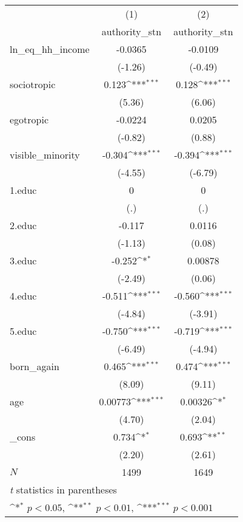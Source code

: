 \documentclass[11pt]{article}
\begin{document}
{
\def\sym#1{\ifmmode^{#1}\else\(^{#1}\)\fi}
\begin{tabular}{l*{2}{c}}
\hline\hline
            &\multicolumn{1}{c}{(1)}&\multicolumn{1}{c}{(2)}\\
            &\multicolumn{1}{c}{authority\_stn}&\multicolumn{1}{c}{authority\_stn}\\
\hline
ln\_eq\_hh\_income&     -0.0365         &     -0.0109         \\
            &     (-1.26)         &     (-0.49)         \\
[1em]
sociotropic &       0.123\sym{***}&       0.128\sym{***}\\
            &      (5.36)         &      (6.06)         \\
[1em]
egotropic   &     -0.0224         &      0.0205         \\
            &     (-0.82)         &      (0.88)         \\
[1em]
visible\_minority&      -0.304\sym{***}&      -0.394\sym{***}\\
            &     (-4.55)         &     (-6.79)         \\
[1em]
1.educ      &           0         &           0         \\
            &         (.)         &         (.)         \\
[1em]
2.educ      &      -0.117         &      0.0116         \\
            &     (-1.13)         &      (0.08)         \\
[1em]
3.educ      &      -0.252\sym{*}  &     0.00878         \\
            &     (-2.49)         &      (0.06)         \\
[1em]
4.educ      &      -0.511\sym{***}&      -0.560\sym{***}\\
            &     (-4.84)         &     (-3.91)         \\
[1em]
5.educ      &      -0.750\sym{***}&      -0.719\sym{***}\\
            &     (-6.49)         &     (-4.94)         \\
[1em]
born\_again  &       0.465\sym{***}&       0.474\sym{***}\\
            &      (8.09)         &      (9.11)         \\
[1em]
age         &     0.00773\sym{***}&     0.00326\sym{*}  \\
            &      (4.70)         &      (2.04)         \\
[1em]
\_cons      &       0.734\sym{*}  &       0.693\sym{**} \\
            &      (2.20)         &      (2.61)         \\
\hline
\(N\)       &        1499         &        1649         \\
\hline\hline
\multicolumn{3}{l}{\footnotesize \textit{t} statistics in parentheses}\\
\multicolumn{3}{l}{\footnotesize \sym{*} \(p<0.05\), \sym{**} \(p<0.01\), \sym{***} \(p<0.001\)}\\
\end{tabular}
}
\end{document}
